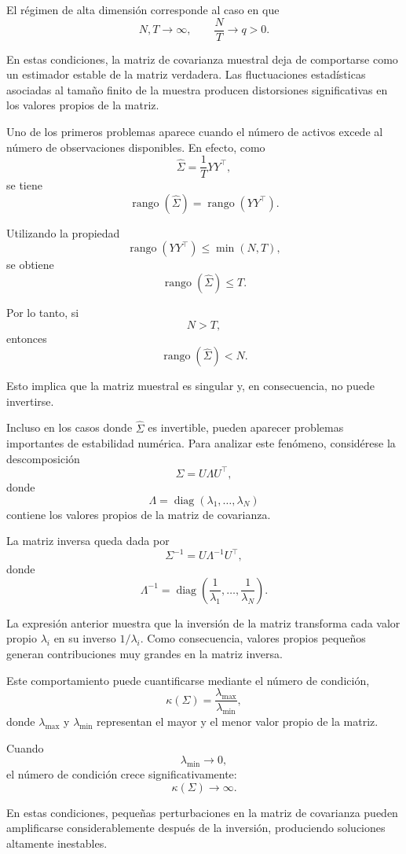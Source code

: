 \documentclass[letterpaper,12pt,oneside]{book}
\begin{document}
El régimen de alta dimensión corresponde al caso en que
\[
N,T\to\infty,
\qquad
\frac{N}{T}\to q>0.
\]

En estas condiciones, la matriz de covarianza muestral deja de comportarse como un estimador estable de la matriz verdadera. Las fluctuaciones estadísticas asociadas al tamaño finito de la muestra producen distorsiones significativas en los valores propios de la matriz.

Uno de los primeros problemas aparece cuando el número de activos excede al número de observaciones disponibles. En efecto, como
\[
\widehat{\Sigma}
=
\frac{1}{T}YY^\top,
\]
se tiene
\[
\operatorname{rango}(\widehat{\Sigma})
=
\operatorname{rango}(YY^\top).
\]

Utilizando la propiedad
\[
\operatorname{rango}(YY^\top)
\leq
\min(N,T),
\]
se obtiene
\[
\operatorname{rango}(\widehat{\Sigma})
\leq
T.
\]

Por lo tanto, si
\[
N>T,
\]
entonces
\[
\operatorname{rango}(\widehat{\Sigma})<N.
\]

Esto implica que la matriz muestral es singular y, en consecuencia, no puede invertirse.

Incluso en los casos donde \(\widehat{\Sigma}\) es invertible, pueden aparecer problemas importantes de estabilidad numérica. Para analizar este fenómeno, considérese la descomposición
\[
\Sigma
=
U\Lambda U^\top,
\]
donde
\[
\Lambda
=
\operatorname{diag}(\lambda_1,\dots,\lambda_N)
\]
contiene los valores propios de la matriz de covarianza.

La matriz inversa queda dada por
\[
\Sigma^{-1}
=
U\Lambda^{-1}U^\top,
\]
donde
\[
\Lambda^{-1}
=
\operatorname{diag}
\left(
\frac{1}{\lambda_1},
\dots,
\frac{1}{\lambda_N}
\right).
\]

La expresión anterior muestra que la inversión de la matriz transforma cada valor propio \(\lambda_i\) en su inverso \(1/\lambda_i\). Como consecuencia, valores propios pequeños generan contribuciones muy grandes en la matriz inversa.

Este comportamiento puede cuantificarse mediante el número de condición,
\[
\kappa(\Sigma)
=
\frac{\lambda_{\max}}{\lambda_{\min}},
\]
donde \(\lambda_{\max}\) y \(\lambda_{\min}\) representan el mayor y el menor valor propio de la matriz.

Cuando
\[
\lambda_{\min}\to0,
\]
el número de condición crece significativamente:
\[
\kappa(\Sigma)\to\infty.
\]

En estas condiciones, pequeñas perturbaciones en la matriz de covarianza pueden amplificarse considerablemente después de la inversión, produciendo soluciones altamente inestables.
\end{document}
